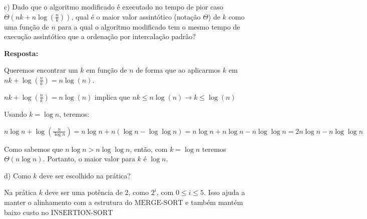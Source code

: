 \documentclass{article}
\begin{document}
    c) Dado que o algoritmo modificado é executado no tempo de pior caso $\Theta(nk + n \log (\frac{n}{k}))$, qual é o maior valor assintótico (notação $\Theta$) de $k$ como uma função de $n$ para a qual o algoritmo modificado tem o mesmo tempo de execução assintótico que a ordenação por intercalação padrão?

    \textbf{Resposta:}

    Queremos encontrar um $k$ em função de $n$ de forma que ao aplicarmos $k$ em $nk + \log (\frac{n}{k}) = n \log(n)$.

    $nk + \log (\frac{n}{k}) = n \log(n)$ implica que 
    $nk \leq n \log(n) \rightarrow k \leq \log(n)$

    Usando $k = \log n$, teremos:

    $n \log n + \log (\frac{n}{\log n}) = n \log n + n (\log n - \log\log n) = n \log n + n \log n - n \log\log n = 2n \log n - n\log\log n$

    Como sabemos que $n \log n > n \log\log n$, então, com $k = \log n$ teremos $\Theta(n \log n)$. Portanto, o maior valor para $k$ é $\log n$.


    d) Como $k$ deve ser escolhido na prática?

    Na prática $k$ deve ser uma potência de 2, como $2^i$, com $0 \leq i \leq 5$. Isso ajuda a manter o alinhamento com a estrutura do $\text{MERGE-SORT}$ e também mantém baixo custo no $\text{INSERTION-SORT}$




    
\end{document}

